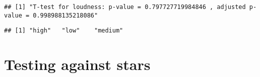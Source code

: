 \documentclass[
]{article}
\newenvironment{Shaded}{\begin{snugshade}}{\end{snugshade}}
\newcommand{\DecValTok}[1]{\textcolor[rgb]{0.00,0.00,0.81}{#1}}
\newcommand{\FunctionTok}[1]{\textcolor[rgb]{0.00,0.00,0.00}{#1}}
\newcommand{\NormalTok}[1]{#1}
\newcommand{\SpecialCharTok}[1]{\textcolor[rgb]{0.00,0.00,0.00}{#1}}
\newcommand{\StringTok}[1]{\textcolor[rgb]{0.31,0.60,0.02}{#1}}
\begin{document}
\begin{Shaded}
\end{Shaded}

\begin{verbatim}
## [1] "T-test for loudness: p-value = 0.797727719984846 , adjusted p-value = 0.998988135218086"
\end{verbatim}

\begin{Shaded}
\end{Shaded}

\begin{verbatim}
## [1] "high"   "low"    "medium"
\end{verbatim}

\hypertarget{testing-against-stars-1}{%
\section{Testing against stars}\label{testing-against-stars-1}}
\end{document}
